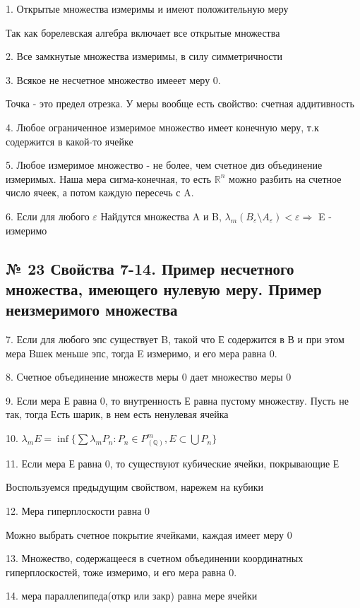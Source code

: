 \documentclass{article}
\begin{document}
1. Открытые множества измеримы и имеют положительную меру

Так как борелевская алгебра включает все открытые множества

2. Все замкнутые множества измеримы, в силу симметричности

3. Всякое не несчетное множество имееет меру 0.

Точка - это предел отрезка. У меры вообще есть свойство: счетная аддитивность

4. Любое ограниченное измеримое множество имеет конечную меру, т.к содержится в какой-то ячейке

5. Любое измеримое множество - не более, чем счетное диз объединение измеримых. Наша мера сигма-конечная, то есть $\mathbb{R}^n$ можно разбить на счетное число ячеек, а потом каждую пересечь с A.

6. Если для любого $\varepsilon$ Найдутся множества A и B, $\lambda_m(B_\varepsilon \setminus A_\varepsilon) < \varepsilon \Rightarrow$ E - измеримо


\subsection{ \footnotesize № 23 Свойства 7-14. Пример несчетного множества, имеющего нулевую меру. Пример неизмеримого множества}

7. Если для любого эпс существует B, такой что Е содержится в В и при этом мера Bшек меньше эпс, тогда E измеримо, и его мера равна 0.

8. Счетное объединение множеств меры 0 дает множество меры 0

9. Если мера Е равна 0, то внутренность Е равна пустому множеству. Пусть не так, тогда Есть шарик, в нем есть ненулевая ячейка

10. $\lambda_m E = \inf{\{\sum{\lambda_m P_n} : P_n \in P^m_{(\mathbb{Q})}, E \subset \bigcup{P_n}\}}$

11. Если мера Е равна 0, то существуют кубические ячейки, покрывающие Е

Воспользуемся предыдущим свойством, нарежем на кубики

12. Мера гиперплоскости равна 0

Можно выбрать счетное покрытие ячейками, каждая имеет меру 0

13. Множество, содержащееся в счетном объединении координатных гиперплоскостей, тоже измеримо, и его мера равна 0.

14. мера параллепипеда(откр или закр) равна мере ячейки
\end{document}

